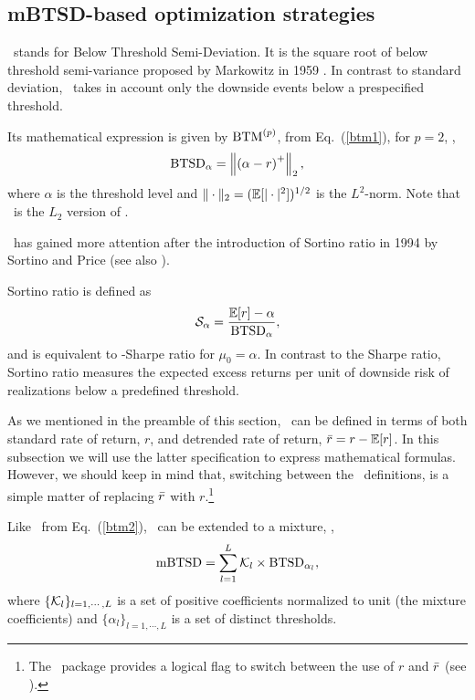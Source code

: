 
\subsection{mBTSD-based optimization strategies}\label{S:mBTSD}

\BTSD\ stands for Below Threshold Semi-Deviation.
It is the square root of below threshold semi-variance proposed by Markowitz in 1959 \cite{Markowitz2}.
In contrast to standard deviation, \BTSD\ takes in account only the downside events below a prespecified threshold.

Its mathematical expression is given by ${\rm BTM}^{(p)}$, from Eq.~(\ref{btm1}), for $p=2$, \ie,
\begin{equation}
    \BTSD_\alpha = \left\| \left( \alpha - r \right)^+ \right\|_2,
    \label{btsd01}
\end{equation}
where $\alpha$ is the threshold level and $\|\cdot\|_2 = ({\mathbb E}[|\cdot |^2])^{1/2}$ is the $L^2$-norm.
Note that \BTSD\ is the $L_2$ version of \BTAD.

\BTSD\ has gained more attention after the introduction of
Sortino ratio in 1994 by Sortino and Price \cite{Sortino} (see also \cite{Kaplan}).

Sortino ratio is defined as
\begin{equation}
    \Sortino_\alpha = \frac{\mE[r] - \alpha}{\BTSD_\alpha},
    \label{btsd02}
\end{equation}
and is equivalent to \BTSD-Sharpe ratio for $\mu_0 = \alpha$.
In contrast to the Sharpe ratio, Sortino ratio measures the expected excess returns 
per unit of downside risk of realizations below a predefined threshold.

As we mentioned in the preamble of this section, \BTSD\ can be defined in terms of both standard rate of return, $r$, and
detrended rate of return, ${\bar r} = r - {\mathbb E}[r]$. In this subsection we will use the latter specification to express mathematical formulas.
However, we should keep in
mind that, switching between the \BTSD\ definitions, is a simple matter of replacing ${\bar r}$ with $r$.\footnote{The \azapy\ package provides a logical
flag to switch between the use of $r$ and ${\bar r}$ (see \azapydoc).}

Like \mBTAD\ from Eq.~(\ref{btm2}), \BTSD\ can be extended to a mixture, \ie,
\begin{equation}
    \mBTSD = \sum_{l=1}^L \cK_l \times \BTSD_{\alpha_l},
    \label{btsd0}
\end{equation}
where $\{{\cal K}_l\}_{l=1,\cdots,L}$ is a set of positive coefficients normalized to unit (the mixture coefficients) and
$\{\alpha_l\}_{l=1,\cdots,L}$ is a set of distinct thresholds.

